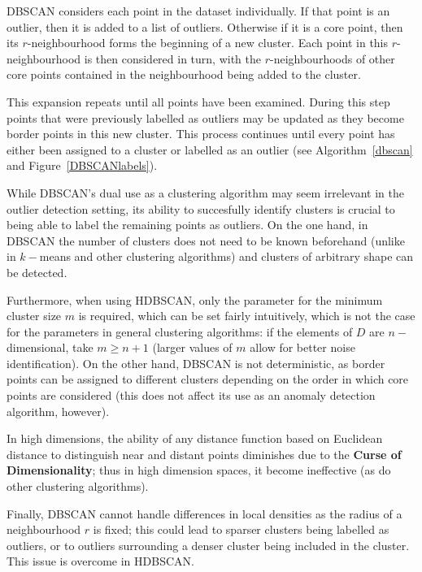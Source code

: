 \documentclass[20pt,landscape,footrule,headrule]{foils}
\newcommand{\newl}{\newline\newline}
\begin{document}
DBSCAN considers each point in the dataset individually. If that point is an outlier, then it is added to a list of outliers. Otherwise if it is a core point, then its $r$-neighbourhood forms the beginning of a new cluster. Each point in this $r$-neighbourhood is then considered in turn, with the $r$-neighbourhoods of other core points contained in the neighbourhood being added to the cluster. \par This expansion repeats until all points have been examined. During this step points that were previously labelled as outliers may be updated as they become border points in this new cluster. This process continues until every point has either been assigned to a cluster or labelled as an outlier (see Algorithm~\ref{dbscan} and Figure~\ref{DBSCANlabels}).

While DBSCAN's dual use as a clustering algorithm may seem irrelevant in the outlier detection setting,
its ability to succesfully identify clusters is crucial to being able to label the remaining points as outliers.
\newl 
On the one hand, in DBSCAN the number of clusters does not need to be known beforehand (unlike in $k-$means and other clustering algorithms) and clusters of arbitrary shape can be detected. \par Furthermore, when using HDBSCAN, only the parameter for the minimum cluster size $m$ is required, which can be set fairly intuitively, which is not the case for the parameters in general clustering algorithms: if the elements of $D$ are $n-$dimensional, take $m\geq n+1$ (larger values of $m$ allow for better noise identification).
\newl On the other hand, DBSCAN is not deterministic, as border points can be assigned to different clusters depending on the order in which core points are considered (this does not affect its use as an anomaly detection algorithm, however).
\par In high dimensions, the ability of any distance function based on Euclidean distance to distinguish near and distant points diminishes due to the \textbf{Curse of Dimensionality}; thus in high dimension spaces, it  become ineffective (as do  other clustering algorithms). \par  Finally, DBSCAN cannot handle differences in local densities as the radius of a neighbourhood $r$ is fixed; this could lead to sparser clusters being labelled as outliers, or to outliers surrounding a denser cluster being included in the cluster.
This issue is overcome in HDBSCAN.
\end{document}
